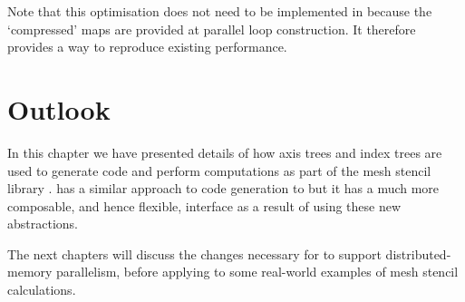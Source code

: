 \documentclass[thesis]{subfiles}
\begin{document}
Note that this optimisation does not need to be implemented in  because the `compressed' maps are provided at parallel loop construction.
It therefore provides a way to reproduce existing  performance.

\section{Outlook}

In this chapter we have presented details of how axis trees and index trees are used to generate code and perform computations as part of the mesh stencil library .
 has a similar approach to code generation to  but it has a much more composable, and hence flexible, interface as a result of using these new abstractions.

The next chapters will discuss the changes necessary for  to support distributed-memory parallelism, before applying  to some real-world examples of mesh stencil calculations.
\end{document}
